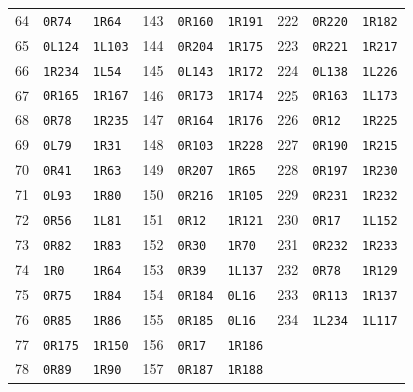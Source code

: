 \begin{longtable}{rll@{\qquad}rll@{\qquad}rll}
64 & \texttt{0R74} & \texttt{1R64} & 143 & \texttt{0R160} & \texttt{1R191} & 222 & \texttt{0R220} & \texttt{1R182}\\
65 & \texttt{0L124} & \texttt{1L103} & 144 & \texttt{0R204} & \texttt{1R175} & 223 & \texttt{0R221} & \texttt{1R217}\\
66 & \texttt{1R234} & \texttt{1L54} & 145 & \texttt{0L143} & \texttt{1R172} & 224 & \texttt{0L138} & \texttt{1L226}\\
67 & \texttt{0R165} & \texttt{1R167} & 146 & \texttt{0R173} & \texttt{1R174} & 225 & \texttt{0R163} & \texttt{1L173}\\
68 & \texttt{0R78} & \texttt{1R235} & 147 & \texttt{0R164} & \texttt{1R176} & 226 & \texttt{0R12} & \texttt{1R225}\\
69 & \texttt{0L79} & \texttt{1R31} & 148 & \texttt{0R103} & \texttt{1R228} & 227 & \texttt{0R190} & \texttt{1R215}\\
70 & \texttt{0R41} & \texttt{1R63} & 149 & \texttt{0R207} & \texttt{1R65} & 228 & \texttt{0R197} & \texttt{1R230}\\
71 & \texttt{0L93} & \texttt{1R80} & 150 & \texttt{0R216} & \texttt{1R105} & 229 & \texttt{0R231} & \texttt{1R232}\\
72 & \texttt{0R56} & \texttt{1L81} & 151 & \texttt{0R12} & \texttt{1R121} & 230 & \texttt{0R17} & \texttt{1L152}\\
73 & \texttt{0R82} & \texttt{1R83} & 152 & \texttt{0R30} & \texttt{1R70} & 231 & \texttt{0R232} & \texttt{1R233}\\
74 & \texttt{1R0} & \texttt{1R64} & 153 & \texttt{0R39} & \texttt{1L137} & 232 & \texttt{0R78} & \texttt{1R129}\\
75 & \texttt{0R75} & \texttt{1R84} & 154 & \texttt{0R184} & \texttt{0L16} & 233 & \texttt{0R113} & \texttt{1R137}\\
76 & \texttt{0R85} & \texttt{1R86} & 155 & \texttt{0R185} & \texttt{0L16} & 234 & \texttt{1L234} & \texttt{1L117}\\
77 & \texttt{0R175} & \texttt{1R150} & 156 & \texttt{0R17} & \texttt{1R186} &  &  & \\
78 & \texttt{0R89} & \texttt{1R90} & 157 & \texttt{0R187} & \texttt{1R188} &  &  & \\
\end{longtable}
\endgroup
